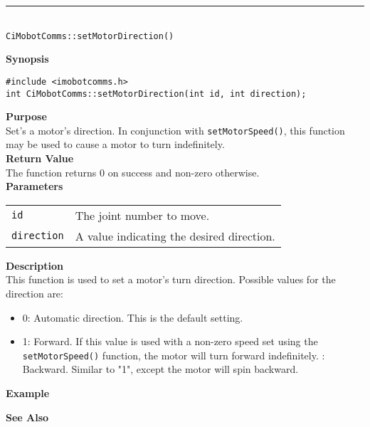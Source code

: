 \noindent
\vspace{5pt}
\rule{4.5in}{0.015in}\\
\noindent
{\LARGE \texttt{CiMobotComms::setMotorDirection()}}\\
{}

\noindent
{\bf Synopsis}\\
\begin{verbatim}
#include <imobotcomms.h>
int CiMobotComms::setMotorDirection(int id, int direction);
\end{verbatim}

\noindent
{\bf Purpose}\\
Set's a motor's direction. In conjunction with \texttt{setMotorSpeed()}, this
function may be used to cause a motor to turn indefinitely.\\

\noindent
{\bf Return Value}\\
The function returns 0 on success and non-zero otherwise.\\

\noindent
{\bf Parameters}
\vspace{-0.1in}
\begin{description}
\item               
\begin{tabular}{p{20 mm}p{145 mm}}
\texttt{id} & The joint number to move. \\
\texttt{direction} & A value indicating the desired direction.
\end{tabular}
\end{description}

\noindent
{\bf Description}\\
This function is used to set a motor's turn direction. Possible values for the
direction are:
\begin{itemize}
\item 0: Automatic direction. This is the default setting. 
\item 1: Forward. If this value is used with a non-zero speed set using the
\texttt{setMotorSpeed()} function, the motor will turn forward indefinitely.
: Backward. Similar to "1", except the motor will spin backward.
\end{itemize}

\noindent
{\bf Example}\\
\noindent

\noindent
{\bf See Also}\\

